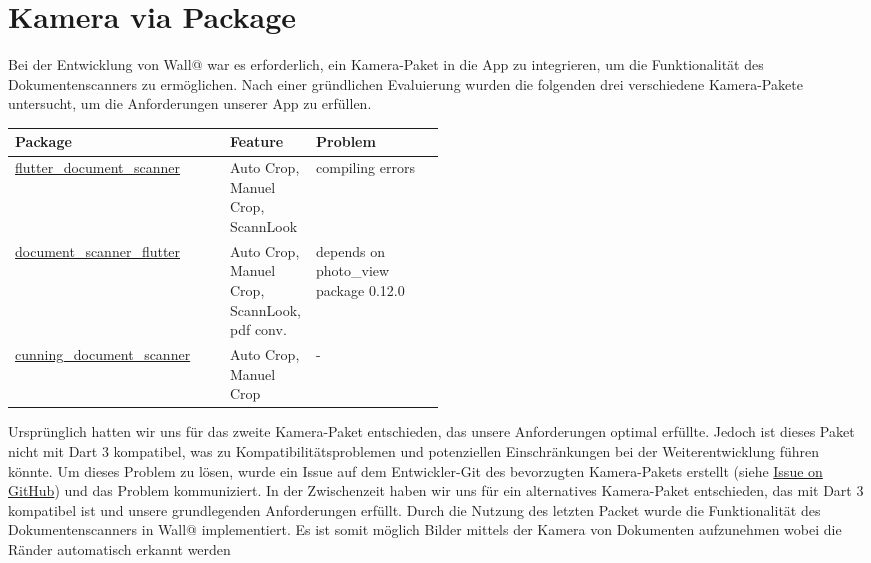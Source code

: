 \section{Kamera via Package}

Bei der Entwicklung von Wall@ war es erforderlich, ein Kamera-Paket in die App zu integrieren, um die Funktionalität des Dokumentenscanners zu ermöglichen. 
Nach einer gründlichen Evaluierung wurden die folgenden drei verschiedene Kamera-Pakete untersucht, um die Anforderungen unserer App zu erfüllen.
\newline
\newline
\begin{tabular}{|l|>{\raggedright\arraybackslash}p{0.2\linewidth}|>{\raggedright\arraybackslash}p{0.3\linewidth}|}
  \hline
  Package & Feature & Problem \\
  \hline
  \href{https://pub.dev/packages/flutter_document_scanner}{flutter\_document\_scanner} & Auto Crop, Manuel Crop, ScannLook & compiling errors \\
  \hline
  \href{https://pub.dev/documentation/document_scanner_flutter/latest/}{document\_scanner\_flutter} & Auto Crop, Manuel Crop, ScannLook, pdf conv. & depends on photo\_view package 0.12.0 \\
  \hline
  \href{https://pub.dev/packages/cunning_document_scanner}{cunning\_document\_scanner} & Auto Crop, Manuel Crop & - \\
  \hline
\end{tabular}
\newline
\newline
\newline
Ursprünglich hatten wir uns für das zweite Kamera-Paket entschieden, das unsere Anforderungen optimal erfüllte. 
Jedoch ist dieses Paket nicht mit Dart 3 kompatibel, was zu Kompatibilitätsproblemen und potenziellen Einschränkungen 
bei der Weiterentwicklung führen könnte.
\newline
\newline
Um dieses Problem zu lösen, wurde ein Issue auf dem Entwickler-Git des bevorzugten Kamera-Pakets erstellt 
(siehe \href{https://github.com/ishaquehassan/document_scanner_flutter/issues/33}{Issue on GitHub}) und das Problem kommuniziert. 
In der Zwischenzeit haben wir uns für ein alternatives Kamera-Paket entschieden, das mit Dart 3 kompatibel ist und 
unsere grundlegenden Anforderungen erfüllt.
Durch die Nutzung des letzten Packet wurde die Funktionalität des Dokumentenscanners in Wall@ implementiert.
Es ist somit möglich Bilder mittels der Kamera von Dokumenten aufzunehmen wobei die Ränder automatisch erkannt werden 
